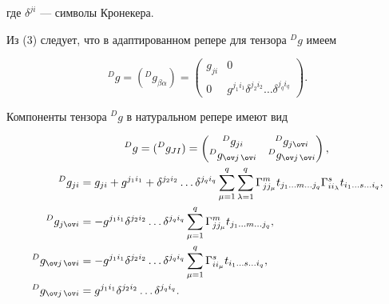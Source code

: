 где $\delta^{ji}$ --- символы Кронекера.


Из (3) следует, что в адаптированном репере для тензора ${}^Dg$ имеем


\begin{equation}


{}^Dg=({}^Dg_{\beta\alpha})=


\begin{pmatrix}


g_{ji} & 0 \\ 0 & g^{j_1i_1}\delta^{j_2i_2}\dotsc


\delta^{j_q i_q}


\end{pmatrix}.


\end{equation}


Компоненты тензора  ${}^Dg$ в натуральном репере имеют вид


\begin{align*}


&\qquad\qquad {}^Dg=({}^Dg_{JI})=


\begin{pmatrix}


{}^Dg_{ji}& {}^Dg_{j{\ov i}} \\


{}^Dg_{{\ov j}\,{\ov i}} & {}^Dg_{{\ov j}\,{\ov i}}


\end{pmatrix}


, \\


%


{}^Dg_{ji}&=g_{ji}+g^{j_1i_1}+\delta^{j_2i_2}\dotsc


\delta^{j_q i_q}\sum^q_{\mu=1}\sum^q_{\lambda=1}


\Gamma^m_{jj_\mu}t_{j_1\dotsc m\dotsc j_q}


\Gamma^s_{ii_\lambda}t_{i_1\dotsc s\dotsc i_q}, \\


%


{}^Dg_{j{\ov i}}&=-g^{j_1i_1}\delta^{j_2i_2}\dotsc


\delta^{j_q i_q}\sum^q_{\mu=1}\Gamma^m_{jj_\mu}


t_{j_1\dotsc m\dotsc j_q}, \\


%


{}^Dg_{{\ov j}\,{\ov i}}&=-g^{j_1i_1}\delta^{j_2i_2}\dotsc


\delta^{j_q i_q}\sum^q_{\mu=1}\Gamma^s_{ii_\mu}


t_{i_1\dotsc s\dotsc i_q}, \\


%


{}^Dg_{{\ov j}\,{\ov i}}&=g^{j_1i_1}\delta^{j_2i_2}\dotsc


\delta^{j_q i_q}.


\end{align*}


